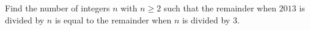 Find the number of integers $n$ with $n \ge 2$ such that the remainder when $2013$ is divided by $n$ is equal to the remainder when $n$ is divided by $3$.
